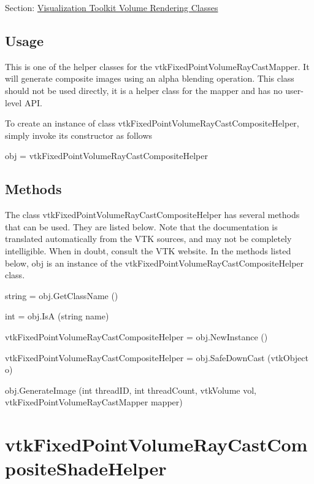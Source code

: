 Section\-: \hyperlink{sec_vtkvolumerendering}{Visualization Toolkit Volume Rendering Classes} \hypertarget{vtkwidgets_vtkxyplotwidget_Usage}{}\subsection{Usage}\label{vtkwidgets_vtkxyplotwidget_Usage}
This is one of the helper classes for the vtk\-Fixed\-Point\-Volume\-Ray\-Cast\-Mapper. It will generate composite images using an alpha blending operation. This class should not be used directly, it is a helper class for the mapper and has no user-\/level A\-P\-I.

To create an instance of class vtk\-Fixed\-Point\-Volume\-Ray\-Cast\-Composite\-Helper, simply invoke its constructor as follows \begin{DoxyVerb}  obj = vtkFixedPointVolumeRayCastCompositeHelper
\end{DoxyVerb}
 \hypertarget{vtkwidgets_vtkxyplotwidget_Methods}{}\subsection{Methods}\label{vtkwidgets_vtkxyplotwidget_Methods}
The class vtk\-Fixed\-Point\-Volume\-Ray\-Cast\-Composite\-Helper has several methods that can be used. They are listed below. Note that the documentation is translated automatically from the V\-T\-K sources, and may not be completely intelligible. When in doubt, consult the V\-T\-K website. In the methods listed below, {\ttfamily obj} is an instance of the vtk\-Fixed\-Point\-Volume\-Ray\-Cast\-Composite\-Helper class. 
\begin{DoxyItemize}
\item {\ttfamily string = obj.\-Get\-Class\-Name ()}  
\item {\ttfamily int = obj.\-Is\-A (string name)}  
\item {\ttfamily vtk\-Fixed\-Point\-Volume\-Ray\-Cast\-Composite\-Helper = obj.\-New\-Instance ()}  
\item {\ttfamily vtk\-Fixed\-Point\-Volume\-Ray\-Cast\-Composite\-Helper = obj.\-Safe\-Down\-Cast (vtk\-Object o)}  
\item {\ttfamily obj.\-Generate\-Image (int thread\-I\-D, int thread\-Count, vtk\-Volume vol, vtk\-Fixed\-Point\-Volume\-Ray\-Cast\-Mapper mapper)}  
\end{DoxyItemize}\hypertarget{vtkvolumerendering_vtkfixedpointvolumeraycastcompositeshadehelper}{}\section{vtk\-Fixed\-Point\-Volume\-Ray\-Cast\-Composite\-Shade\-Helper}\label{vtkvolumerendering_vtkfixedpointvolumeraycastcompositeshadehelper}

